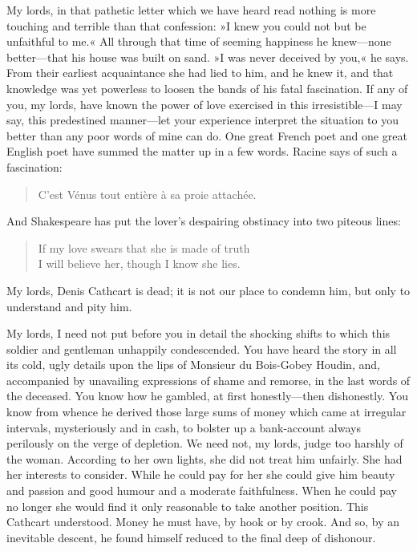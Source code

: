 \begin{dialogue}
My lords, in that pathetic letter which we have heard read nothing is more touching and terrible than that confession: »I knew you could not but be unfaithful to me.« All through that time of seeming happiness he knew\allowbreak---\allowbreak none better\allowbreak---\allowbreak that his house was built on sand. »I was never deceived by you,« he says. From their earliest acquaintance she had lied to him, and he knew it, and that knowledge was yet powerless to loosen the bands of his fatal fascination. If any of you, my lords, have known the power of love exercised in this irresistible\allowbreak---\allowbreak I may say, this predestined manner\allowbreak---\allowbreak let your experience interpret the situation to you better than any poor words of mine can do. One great French poet and one great English poet have summed the matter up in a few words. Racine says of such a fascination:

\begin{quote}C'est Vénus tout entière à sa proie attachée.\end{quote}

\smallskip 

And Shakespeare has put the lover's despairing obstinacy into two piteous lines:

\begin{verse}
If my love swears that she is made of truth\\
I will believe her, though I know she lies.\\
\end{verse}

\smallskip 

My lords, Denis Cathcart is dead; it is not our place to condemn him, but only to understand and pity him.

\smallskip 

My lords, I need not put before you in detail the shocking shifts to which this soldier and gentleman unhappily condescended. You have heard the story in all its cold, ugly details upon the lips of Monsieur du Bois-Gobey Houdin, and, accompanied by unavailing expressions of shame and remorse, in the last words of the deceased. You know how he gambled, at first honestly\allowbreak---\allowbreak then dishonestly. You know from whence he derived those large sums of money which came at irregular intervals, mysteriously and in cash, to bolster up a bank-account always perilously on the verge of depletion. We need not, my lords, judge too harshly of the woman. According to her own lights, she did not treat him unfairly. She had her interests to consider. While he could pay for her she could give him beauty and passion and good humour and a moderate faithfulness. When he could pay no longer she would find it only reasonable to take another position. This Cathcart understood. Money he must have, by hook or by crook. And so, by an inevitable descent, he found himself reduced to the final deep of dishonour.


\end{dialogue}
